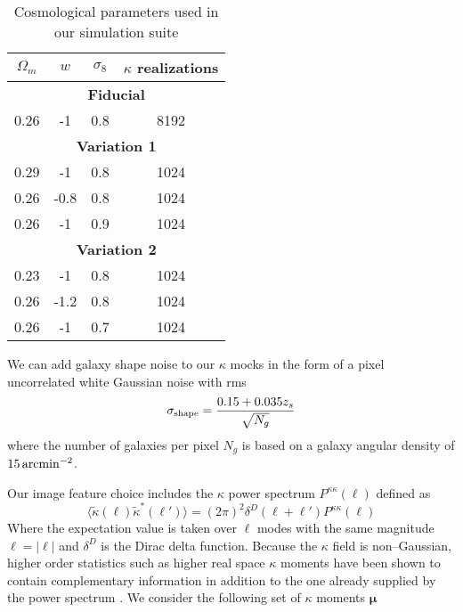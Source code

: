 \documentclass[reprint,aps,prd,superscriptaddress,showkeys,showpacs]{revtex4-1}
\begin{document}
\begin{table}
\begin{center}

\begin{tabular}{c|c|c|c}
$\Omega_m$ & $w$ & $\sigma_8$ & $\kappa$ realizations \\ \hline \hline
\multicolumn{4}{c}{\textbf{Fiducial}} \\ \hline
0.26 & -1 & 0.8 & 8192 \\ \hline

\multicolumn{4}{c}{\textbf{Variation 1}} \\ \hline
0.29 & -1 & 0.8 & 1024 \\
0.26 & -0.8 & 0.8 & 1024 \\
0.26 & -1 & 0.9 & 1024 \\ \hline

\multicolumn{4}{c}{\textbf{Variation 2}} \\ \hline
0.23 & -1 & 0.8 & 1024 \\
0.26 & -1.2 & 0.8 & 1024 \\
0.26 & -1 & 0.7 & 1024 \\ \hline

\end{tabular}

\end{center}

\caption{Cosmological parameters used in our simulation suite}
\label{tab:cosmopar}

\end{table}

We can add galaxy shape noise to our $\kappa$ mocks in the form of a pixel uncorrelated white Gaussian noise \citep{SongKnox} with rms
\begin{equation}
\label{par:shaperms}
\sigma_{\rm shape} = \frac{0.15+0.035z_s}{\sqrt{N_g}}
\end{equation}
%
where the number of galaxies per pixel $N_g$ is based on a galaxy angular density of $15\,{\rm arcmin}^{-2}$. 

Our image feature choice includes the $\kappa$ power spectrum $P^{\kappa\kappa}(\ell)$ defined as 
\begin{equation}
\label{par:powerdef}
\langle\tilde{\kappa}(\pmb{\ell})\tilde{\kappa}^*(\pmb{\ell}')\rangle = (2\pi)^2\delta^D(\pmb{\ell}+\pmb{\ell}')P^{\kappa\kappa}(\ell) 
\end{equation}
%
Where the expectation value is taken over $\pmb{\ell}$ modes with the same magnitude $\ell=\vert\pmb{\ell}\vert$ and $\delta^D$ is the Dirac delta function. Because the $\kappa$ field is non--Gaussian, higher order statistics such as higher real space $\kappa$ moments have been shown to contain complementary information in addition to the one already supplied by the power spectrum \citep{MinkPetri,CFHTMink,NG-Jain1,NG-Jain2}. We consider the following set of $\kappa$ moments $\pmb{\mu}$
\end{document}
